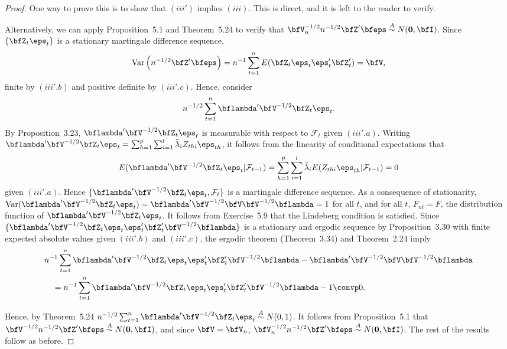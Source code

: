 \begin{proof}
One way to prove this is to show that $(iii')$ implies $(iii)$. This is direct, and it is left to the reader to verify.

Alternatively, we can apply Proposition~5.1 and Theorem~5.24 to verify that $\bfV_n^{-1/2}n^{-1/2}\bfZ'\bfeps \overset{A}{\sim} N(\mathbf{0}, \bfI)$. Since $\{\bfZ_t\eps_t\}$ is a stationary martingale difference sequence,
\[
\Var\left(n^{-1/2}\bfZ'\bfeps\right) = n^{-1}\sum_{t=1}^{n}E(\bfZ_t\eps_t\eps_t'\bfZ_t') = \bfV,
\]
finite by $(iii'.b)$ and positive definite by $(iii'.c)$. Hence, consider
\[
n^{-1/2}\sum_{t=1}^{n}\bflambda'\bfV^{-1/2}\bfZ_t\eps_t.
\]
By Proposition~3.23, $\bflambda'\bfV^{-1/2}\bfZ_t\eps_t$ is measurable with respect to $\mathcal{F}_t$ given $(iii'.a)$. Writing $\bflambda'\bfV^{-1/2}\bfZ_t\eps_t = \sum_{h=1}^{p}\sum_{i=1}^{l}\tilde{\lambda}_i Z_{thi}\eps_{th}$, it follows from the linearity of conditional expectations that
\[
E(\bflambda'\bfV^{-1/2}\bfZ_t\eps_t|\mathcal{F}_{t-1}) = \sum_{h=1}^{p}\sum_{i=1}^{l}\tilde{\lambda}_i E(Z_{thi}\eps_{th}|\mathcal{F}_{t-1}) = 0
\]
given $(iii'.a)$. Hence $\{\bflambda'\bfV^{-1/2}\bfZ_t\eps_t, \mathcal{F}_t\}$ is a martingale difference sequence. As a consequence of stationarity, $\Var(\bflambda'\bfV^{-1/2}\bfZ_t\eps_t) = \bflambda'\bfV^{-1/2}\bfV\bfV^{-1/2}\bflambda = 1$ for all $t$, and for all $t$, $F_{nt} = F$, the distribution function of $\bflambda'\bfV^{-1/2}\bfZ_t\eps_t$. It follows from Exercise~5.9 that the Lindeberg condition is satisfied. Since $\{\bflambda'\bfV^{-1/2}\bfZ_t\eps_t\eps_t'\bfZ_t'\bfV^{-1/2}\bflambda\}$ is a stationary and ergodic sequence by Proposition~3.30 with finite expected absolute values given $(iii'.b)$ and $(iii'.c)$, the ergodic theorem (Theorem~3.34) and Theorem~2.24 imply
\begin{align*}
&n^{-1}\sum_{t=1}^{n}\bflambda'\bfV^{-1/2}\bfZ_t\eps_t\eps_t'\bfZ_t'\bfV^{-1/2}\bflambda - \bflambda'\bfV^{-1/2}\bfV\bfV^{-1/2}\bflambda \\
&\quad= n^{-1}\sum_{t=1}^{n}\bflambda'\bfV^{-1/2}\bfZ_t\eps_t\eps_t'\bfZ_t'\bfV^{-1/2}\bflambda - 1 \convp 0.
\end{align*}

Hence, by Theorem~5.24 $n^{-1/2}\sum_{t=1}^{n}\bflambda'\bfV^{-1/2}\bfZ_t\eps_t \overset{A}{\sim} N(0,1)$. It follows from Proposition~5.1 that $\bfV^{-1/2}n^{-1/2}\bfZ'\bfeps \overset{A}{\sim} N(\mathbf{0}, \bfI)$, and since $\bfV = \bfV_n$, $\bfV_n^{-1/2}n^{-1/2}\bfZ'\bfeps \overset{A}{\sim} N(\mathbf{0}, \bfI)$. The rest of the results follow as before.
\end{proof}

